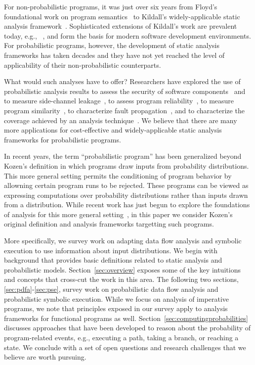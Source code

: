 For non-probabilistic programs, it was just over six years
from Floyd's foundational work on program semantics~\cite{FLOYD67} 
to Kildall's widely-applicable static analysis framework~\cite{kildall1973unified}.
Sophisticated extensions of Kildall's work are prevalent 
today, e.g., ~\cite{lam11:_soot_java,Lattner:2004:LLVM}, and form 
the basis for modern software development environments.
For probabilistic programs, however, the development of 
static analysis frameworks has taken decades and 
they have not yet reached the level of applicability of 
their non-probabilistic counterparts.

What would such analyses have to offer?
Researchers have explored the use of probabilistic analysis
results to assess the security of software 
components~\cite{mardziel2013dynamic} and to measure side-channel 
leakage~\cite{CSF16,FSE16},
to assess program reliability~\cite{Filieri2013}, to measure program
similarity~\cite{Geldenhuys2012}, 
to characterize fault propagation~\cite{RiskAwareTransformation},
and to characterize the coverage
achieved by an analysis technique~\cite{DwyerASE11}.
We believe that there are many more applications for cost-effective
and widely-applicable static analysis frameworks for probabilistic
programs.

In recent years, the term ``probabilistic program'' has been generalized 
beyond Kozen's definition in which programs draw inputs from probability 
distributions.
This more general setting permits the conditioning of program behavior by
allowning certain program runs to be rejected.  
These programs can be viewed as expressing computations over 
probability distributions rather than inputs drawn from a distribution.  
While recent work has just begun to explore the foundations of analysis for
this more general setting~\cite{claret2013bayesian,Gordon2014}, 
in this paper we consider
Kozen's original definition and analysis frameworks targetting such programs.

More specifically, we survey work on adapting data flow analysis 
and symbolic execution to use information about input distributions.
We begin with background that provides basic definitions
related to static analysis and probabilistic models.
Section~\ref{sec:overview} exposes some of the key
intuitions and concepts that cross-cut the work in this area.
The following two sections, \ref{sec:pdfa}-\ref{sec:pse}, 
survey work on probabilistic data flow analysis and probabilistic
symbolic execution.  
While we focus on analysis of imperative programs, we note that
principles exposed in our survey apply to analysis frameworks 
for functional programs as well.
Section~\ref{sec:computingprobabilities} discusses approaches that
have been developed to reason about the probability of program-related 
events, e.g., executing a path, taking a branch, or reaching a state.
We conclude with a set of open questions
and research challenges that we believe are worth pursuing.

